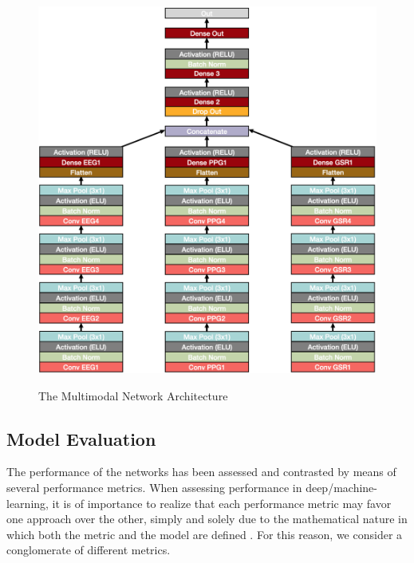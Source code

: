 \documentclass[12pt]{article}
\begin{document}
\begin{figure}
\caption{The Multimodal Network Architecture}
\bigskip
\includegraphics[scale=0.69]{multi_model_architecture}
\label{fig:multiarchitecture}
\end{figure}
\restoregeometry

\newpage
\subsection{Model Evaluation}
The performance of the networks has been assessed and contrasted by means of several performance metrics. When assessing performance in deep/machine-learning, it is of importance to realize that each performance metric may favor one approach over the other, simply and solely due to the mathematical nature in which both the metric and the model are defined \cite{gunawardana2009survey}. For this reason, we consider a conglomerate of different metrics. 
\end{document}
